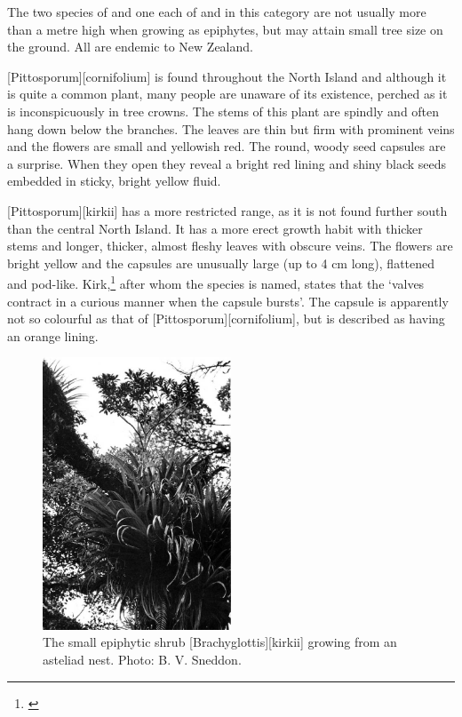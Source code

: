 The two species of  and one each of  and  in this category are not usually more than a metre high when growing as epiphytes, but may attain small tree size on the ground.
All are endemic to New Zealand.

[Pittosporum][cornifolium] is found throughout the North Island and although it is quite a common plant, many people are unaware of its existence, perched as it is inconspicuously in tree crowns.
The stems of this plant are spindly and often hang down below the branches.
The leaves are thin but firm with prominent veins and the flowers are small and yellowish red.
The round, woody seed capsules are a surprise.
When they open they reveal a bright red lining and shiny black seeds embedded in sticky, bright yellow fluid.

[Pittosporum][kirkii] has a more restricted range, as it is not found further south than the central North Island.
It has a more erect growth habit with thicker stems and longer, thicker, almost fleshy leaves with obscure veins.
The flowers are bright yellow and the capsules are unusually large (up to 4 cm long), flattened and pod-like.
Kirk,\footnote{\cite{kirk1869botany}} after whom the species is named, states that the `valves contract in a curious manner when the capsule bursts'.
The capsule is apparently not so colourful as that of [Pittosporum][cornifolium], but is described as having an orange lining.

\begin{figure}
	\includegraphics[width=0.5\textwidth]{graphics/figure44brachyglottis-kirkii.jpg}
	\centering
	\caption[The small epiphytic shrub \emph{Brachyglottis kirkii}]{The small epiphytic shrub [Brachyglottis][kirkii] growing from an asteliad nest.
	Photo: B. V. Sneddon.}%
	\label{fig:44brachyglottis-kirkii}
\end{figure}

